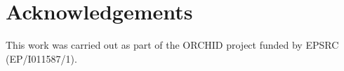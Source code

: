 \documentclass{aamas_demos}
\begin{document}


\maketitle




\vspace{-2mm}

\vspace{-4mm}
%
\section*{Acknowledgements}\vspace{-1mm}
This work was carried out as part of the ORCHID project funded by EPSRC (EP/I011587/1). \vspace{-3mm}

{
\small

}
\end{document}
